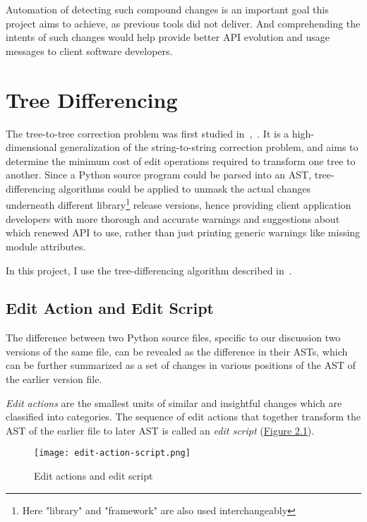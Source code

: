 Automation of detecting such compound changes is an important goal this project aims to achieve, as previous tools did not deliver. And comprehending the intents of such changes would help provide better API evolution and usage messages to client software developers.

\section{Tree Differencing}

The tree-to-tree correction problem was first studied in~\cite{tree-edit-p},~\cite{tree-correction-p}. It is a high-dimensional generalization of the string-to-string correction problem, and aims to determine the minimum cost of edit operations required to transform one tree to another. Since a Python source program could be parsed into an AST, tree-differencing algorithms could be applied to unmask the actual changes underneath different library\footnote{Here "library" and "framework" are also used interchangeably} release versions, hence providing client application developers with more thorough and accurate warnings and suggestions about which renewed API to use, rather than just printing generic warnings like missing module attributes.

In this project, I use the tree-differencing algorithm described in~\cite{DBLP:conf/kbse/FalleriMBMM14}.

\subsection{Edit Action and Edit Script}

The difference between two Python source files, specific to our discussion two versions of the same file, can be revealed as the difference in their ASTs, which can be further summarized as a set of changes in various positions of the AST of the earlier version file.

\textit{Edit actions} are the smallest units of similar and insightful changes which are classified into categories. The sequence of edit actions that together transform the AST of the earlier file to later AST is called an \textit{edit script} (\hyperref[fig:edit-action-script]{Figure 2.1}).

\begin{figure}
	\caption{Edit actions and edit script}
	\label{fig:edit-action-script}
	\texttt{[image: edit-action-script.png]}
\end{figure}

